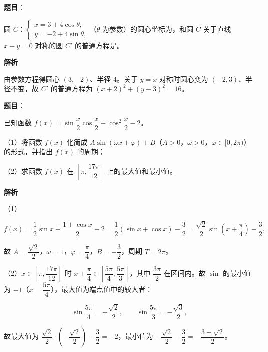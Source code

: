 \begin{answer}

\textbf{题目}：

圆 $C$：$\begin{cases}x=3+4\cos\theta,\\ y=-2+4\sin\theta,\end{cases}$（$\theta$ 为参数）的圆心坐标为\gkblank{}，和圆 $C$ 关于直线 $x-y=0$ 对称的圆 $C'$ 的普通方程是\gkblank{}。

\textbf{解析}

由参数方程得圆心 $(3,-2)$、半径 $4$。关于 $y=x$ 对称时圆心变为 $(-2,3)$、半径不变，故 $C'$ 的普通方程为 $(x+2)^2+(y-3)^2=16$。


\end{answer}
\begin{answer}

\textbf{题目}：

已知函数 $f(x)=\sin\dfrac x2\cos\dfrac x2+\cos^2\dfrac x2-2$。

（1）将函数 $f(x)$ 化简成 $A\sin(\omega x+\varphi)+B$（$A>0$，$\omega>0$，$\varphi\in[0,2\pi)$）的形式，并指出 $f(x)$ 的周期；

（2）求函数 $f(x)$ 在 $\left[\pi,\dfrac{17\pi}{12}\right]$ 上的最大值和最小值。

\textbf{解析}

（1）

\nopagebreak[4]
\[f(x)=\frac12\sin x+\frac{1+\cos x}2-2=\frac12(\sin x+\cos x)-\frac32=\frac{\sqrt2}2\sin\left(x+\frac{\pi}4\right)-\frac32,\]

故 $A=\dfrac{\sqrt2}2$，$\omega=1$，$\varphi=\dfrac{\pi}4$，$B=-\dfrac32$，周期 $T=2\pi$。

（2）$x\in\left[\pi,\dfrac{17\pi}{12}\right]$ 时 $x+\dfrac{\pi}4\in\left[\dfrac{5\pi}4,\dfrac{5\pi}3\right]$，其中 $\dfrac{3\pi}2$ 在区间内。故 $\sin$ 的最小值为 $-1$（$x=\dfrac{5\pi}4$），最大值为端点值中的较大者：

\nopagebreak[4]
\[\sin\frac{5\pi}4=-\frac{\sqrt2}2,\qquad\sin\frac{5\pi}3=-\frac{\sqrt3}2,\]

故最大值为 $\dfrac{\sqrt2}2\cdot\left(-\dfrac{\sqrt2}2\right)-\dfrac32=-2$，最小值为 $-\dfrac{\sqrt2}2-\dfrac32=-\dfrac{3+\sqrt2}2$。


\end{answer}
